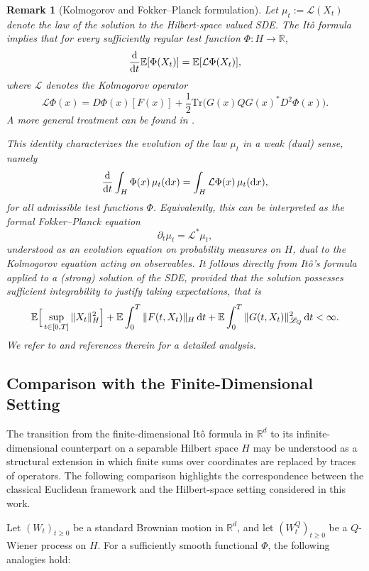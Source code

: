 \documentclass[12pt]{amsart}
\newcommand{\D}[1]{\mbox{\rm #1}}
\newcommand{\dd}{\D{d}}
\numberwithin{equation}{section}
\newtheorem{remark}[theorem]{Remark}
\begin{document}
\begin{remark}[Kolmogorov and Fokker--Planck formulation]
Let $\mu_t := \mathcal L(X_t)$ denote the law of the solution to the Hilbert-space valued SDE. The It\^o formula implies that for every sufficiently regular test function $\Phi:H\to\mathbb{R}$,
\[
    \frac{\dd}{\dd t}\mathbb{E}[\Phi(X_t)] = \mathbb{E}[\mathcal L \Phi(X_t)],
\]
where $\mathcal L$ denotes the Kolmogorov operator
\[
    \mathcal L \Phi(x) = D\Phi(x)[F(x)] + \frac{1}{2} \mathrm{Tr}\big(G(x)QG(x)^* D^2\Phi(x)\big).
\]
A more general treatment can be found in \cite[Chapter 9, page 271]{chow2007stochastic}.

This identity characterizes the evolution of the law $\mu_t$ in a weak (dual) sense, namely
\[
    \frac{\dd}{\dd t}\int_H \Phi(x)\,\mu_t(\dd x) = \int_H \mathcal L \Phi(x)\,\mu_t(\dd x),
\]
for all admissible test functions $\Phi$. Equivalently, this can be interpreted as the formal Fokker--Planck equation
\[
    \partial_t \mu_t = \mathcal L^* \mu_t,
\]
understood as an evolution equation on probability measures on $H$, dual to the Kolmogorov equation acting on observables. It follows directly from It\^o's formula applied to a (strong) solution of the SDE, provided that the solution possesses sufficient integrability to justify taking expectations, that is
\[
    \mathbb{E}\Big[\sup_{t\in[0,T]}\|X_t\|_H^2\Big] + \mathbb{E}\int_0^T \|F(t,X_t)\|_H\,\dd t + \mathbb{E}\int_0^T \|G(t,X_t)\|_{\mathscr L_Q}^2\,\dd t < \infty.
\]
We refer to \cite[Chapter 10, page 403]{bogachev2022fokker} and references therein for a detailed analysis. 
\end{remark}


\subsection{Comparison with the Finite-Dimensional Setting}

The transition from the finite-dimensional It\^o formula in $\mathbb{R}^d$ to its infinite-dimensional counterpart on a separable Hilbert space $H$ may be understood as a structural extension in which finite sums over coordinates are replaced by traces of operators. The following comparison highlights the correspondence between the classical Euclidean framework and the Hilbert-space setting considered in this work.

Let $(W_t)_{t\ge0}$ be a standard Brownian motion in $\mathbb{R}^d$, and let $(W_t^Q)_{t\ge0}$ be a $Q$-Wiener process on $H$. For a sufficiently smooth functional $\Phi$, the following analogies hold:
\end{document}
